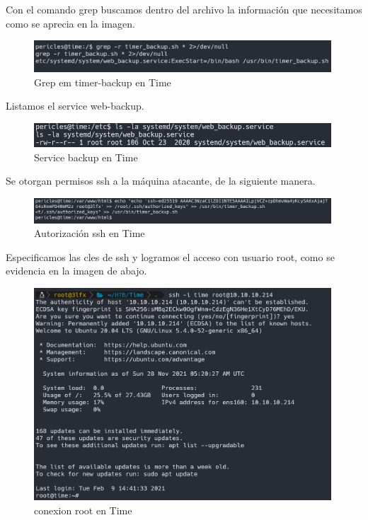         \large{Con el comando grep buscamos dentro del archivo la información que necesitamos como se aprecia en la imagen.}
        \par
        \begin{figure}[H]
            \centering
            \includegraphics[width=0.99\textwidth]{imagenes/time/12_grep_timer_sh.png}
            \caption{Grep em timer-backup en Time}
        \end{figure}

        \large{Listamos el service web-backup.}
        \par
        \begin{figure}[H]
            \centering
            \includegraphics[width=0.99\textwidth]{imagenes/time/13_perm_service_backup.png}
            \caption{Service backup en Time}
        \end{figure}

        \large{Se otorgan permisos ssh a la máquina atacante, de la siguiente manera.}
        \par
        \begin{figure}[H]
            \centering
            \includegraphics[width=0.99\textwidth]{imagenes/time/14_ssh_authorized_time.png}
            \caption{Autorización ssh en Time}
        \end{figure}

        \large{Especificamos las cles de ssh y logramos el acceso con usuario root, como se evidencia en la imagen de abajo.}
        \par
        \begin{figure}[H]
            \centering
            \includegraphics[width=0.99\textwidth]{imagenes/time/15_conect_root_time.png}
            \caption{conexion root en Time}
        \end{figure}

